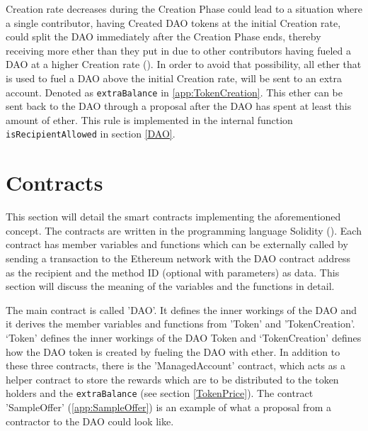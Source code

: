 \documentclass[9pt,oneside]{amsart}
\begin{document}
\begin{multicols}{2}
Creation rate decreases during the Creation Phase could lead to a situation where a single contributor, having Created DAO tokens at the initial Creation rate, could split the DAO immediately after the Creation Phase ends, thereby receiving more ether than they put in due to other contributors having fueled a DAO at a higher Creation rate (\cite{GriffDiscussion}).
In order to avoid that possibility, all ether that is used to fuel a DAO above the initial Creation rate, will be sent to an extra account. Denoted as \verb|extraBalance| in \ref{app:TokenCreation}. This ether can be sent back to the DAO through a proposal after the DAO has spent at least this amount of ether.
This rule is implemented in the internal function \verb|isRecipientAllowed| in section \ref{DAO}.

\section{Contracts}
This section will detail the smart contracts implementing the aforementioned concept. The contracts are written in the programming language Solidity (\cite{ReitwiessnerWoodSolidity}).
Each contract has member variables and functions which can be externally called by sending a transaction to the Ethereum network with the DAO contract address as the recipient and the method ID (optional with parameters) as data. This section will discuss the meaning of the variables and the functions in detail.

The main contract is called 'DAO'. It defines the inner workings of the DAO and it derives the member variables and functions from 'Token' and 'TokenCreation'. ‘Token’ defines the inner workings of the DAO Token and ‘TokenCreation’ defines how the DAO token is created by fueling the DAO with ether. In addition to these three contracts, there is the 'ManagedAccount' contract, which acts as a helper contract to store the rewards which are to be distributed to the token holders and the \verb|extraBalance| (see section \ref{TokenPrice}).
The contract 'SampleOffer' (\ref{app:SampleOffer}) is an example of what a proposal from a contractor to the DAO could look like.
\end{multicols}
\end{document}
